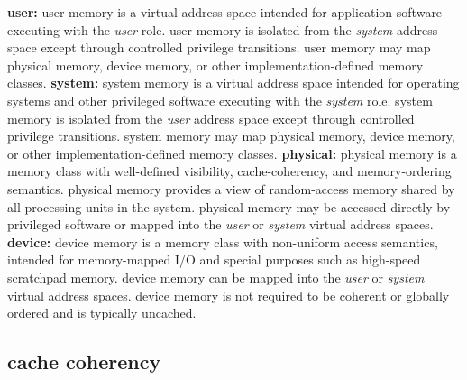 \par\noindent
\textbf{user: }
user memory is a virtual address space intended for application
software executing with the \emph{user} role.
user memory is isolated from the \emph{system} address space except
through controlled privilege transitions.
user memory may map physical memory, device memory, or other
implementation-defined memory classes.
\para
\textbf{system: }
system memory is a virtual address space intended for operating systems
and other privileged software executing with the \emph{system} role.
system memory is isolated from the \emph{user} address space except
through controlled privilege transitions.
system memory may map physical memory, device memory, or other
implementation-defined memory classes.
\para
\textbf{physical: }
physical memory is a memory class with well-defined visibility,
cache-coherency, and memory-ordering semantics.
physical memory provides a view of random-access memory shared
by all processing units in the system.
physical memory may be accessed directly by privileged software or
mapped into the \emph{user} or \emph{system} virtual address spaces.
\para
\textbf{device: }
device memory is a memory class with non-uniform access semantics,
intended for memory-mapped I/O and special purposes such as high-speed
scratchpad memory.
device memory can be mapped into the \emph{user} or \emph{system}
virtual address spaces.
device memory is not required to be coherent or globally ordered
and is typically uncached.

\subsection{cache coherency}

